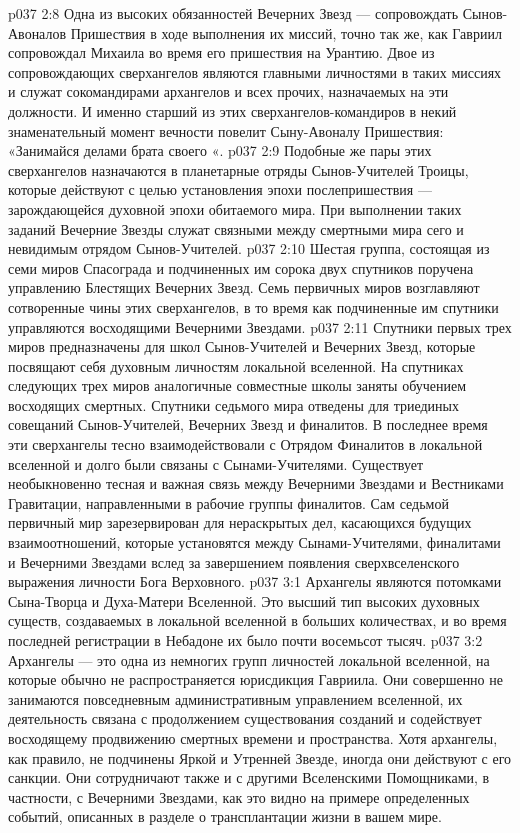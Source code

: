 \vs p037 2:8 Одна из высоких обязанностей Вечерних Звезд --- сопровождать Сынов\hyp{}Авоналов Пришествия в ходе выполнения их миссий, точно так же, как Гавриил сопровождал Михаила во время его пришествия на Урантию. Двое из сопровождающих сверхангелов являются главными личностями в таких миссиях и служат сокомандирами архангелов и всех прочих, назначаемых на эти должности. И именно старший из этих сверхангелов\hyp{}командиров в некий знаменательный момент вечности повелит Сыну\hyp{}Авоналу Пришествия: «Занимайся делами брата своего «.
\vs p037 2:9 Подобные же пары этих сверхангелов назначаются в планетарные отряды Сынов\hyp{}Учителей Троицы, которые действуют с целью установления эпохи послепришествия --- зарождающейся духовной эпохи обитаемого мира. При выполнении таких заданий Вечерние Звезды служат связными между смертными мира сего и невидимым отрядом Сынов\hyp{}Учителей.
\vs p037 2:10 \pc {} Шестая группа, состоящая из семи миров Спасограда и подчиненных им сорока двух спутников поручена управлению Блестящих Вечерних Звезд. Семь первичных миров возглавляют сотворенные чины этих сверхангелов, в то время как подчиненные им спутники управляются восходящими Вечерними Звездами.
\vs p037 2:11 Спутники первых трех миров предназначены для школ Сынов\hyp{}Учителей и Вечерних Звезд, которые посвящают себя духовным личностям локальной вселенной. На спутниках следующих трех миров аналогичные совместные школы заняты обучением восходящих смертных. Спутники седьмого мира отведены для триединых совещаний Сынов\hyp{}Учителей, Вечерних Звезд и финалитов. В последнее время эти сверхангелы тесно взаимодействовали с Отрядом Финалитов в локальной вселенной и долго были связаны с Сынами\hyp{}Учителями. Существует необыкновенно тесная и важная связь между Вечерними Звездами и Вестниками Гравитации, направленными в рабочие группы финалитов. Сам седьмой первичный мир зарезервирован для нераскрытых дел, касающихся будущих взаимоотношений, которые установятся между Сынами\hyp{}Учителями, финалитами и Вечерними Звездами вслед за завершением появления сверхвселенского выражения личности Бога Верховного.
\vs p037 3:1 Архангелы являются потомками Сына\hyp{}Творца и Духа\hyp{}Матери Вселенной. Это высший тип высоких духовных существ, создаваемых в локальной вселенной в больших количествах, и во время последней регистрации в Небадоне их было почти восемьсот тысяч.
\vs p037 3:2 Архангелы --- это одна из немногих групп личностей локальной вселенной, на которые обычно не распространяется юрисдикция Гавриила. Они совершенно не занимаются повседневным административным управлением вселенной, их деятельность связана с продолжением существования созданий и содействует восходящему продвижению смертных времени и пространства. Хотя архангелы, как правило, не подчинены Яркой и Утренней Звезде, иногда они действуют с его санкции. Они сотрудничают также и с другими Вселенскими Помощниками, в частности, с Вечерними Звездами, как это видно на примере определенных событий, описанных в разделе о трансплантации жизни в вашем мире.
